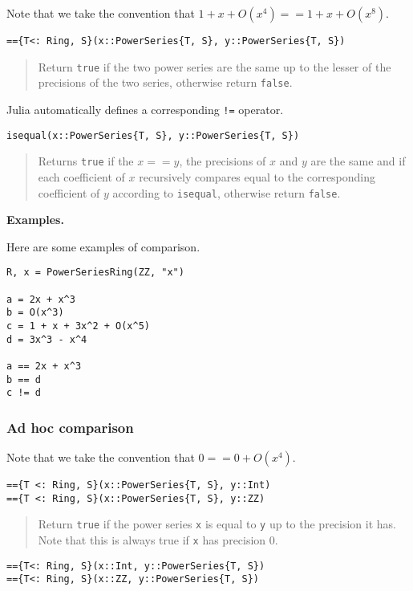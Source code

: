 \documentclass[a4paper,10pt]{article}
\newcommand{\code}{\lstinline}
\newcommand{\desc}[1]{\vspace{-3mm}\begin{quote}#1\end{quote}}
\begin{document}
{{Note that we take the convention that $1 + x + O(x^4) == 1 + x + O(x^8)$. 

\begin{lstlisting}
=={T<: Ring, S}(x::PowerSeries{T, S}, y::PowerSeries{T, S})
\end{lstlisting}

\desc{Return \code{true} if the two power series are the same up to the lesser
of the precisions of the two series, otherwise return \code{false}.}

Julia automatically defines a corresponding \code{!=} operator.

\begin{lstlisting}
isequal(x::PowerSeries{T, S}, y::PowerSeries{T, S})
\end{lstlisting}

\desc{Returns \code{true} if the $x == y$, the precisions of $x$ and $y$ are
the same and if each coefficient of $x$ recursively compares equal to the
corresponding coefficient of $y$ according to \code{isequal}, otherwise return
\code{false}.}

\textbf{Examples.}

Here are some examples of comparison.

\begin{lstlisting}
R, x = PowerSeriesRing(ZZ, "x")

a = 2x + x^3
b = O(x^3)
c = 1 + x + 3x^2 + O(x^5)
d = 3x^3 - x^4

a == 2x + x^3
b == d
c != d
\end{lstlisting}

\subsubsection{Ad hoc comparison}

Note that we take the convention that $0 == 0 + O(x^4)$.

\begin{lstlisting}
=={T <: Ring, S}(x::PowerSeries{T, S}, y::Int)
=={T <: Ring, S}(x::PowerSeries{T, S}, y::ZZ)
\end{lstlisting}

\desc{Return \code{true} if the power series \code{x} is equal to \code{y} up
to the precision it has. Note that this is always true if \code{x} has
precision $0$.}

\begin{lstlisting}
=={T<: Ring, S}(x::Int, y::PowerSeries{T, S})
=={T<: Ring, S}(x::ZZ, y::PowerSeries{T, S})
\end{lstlisting}

}}
\end{document}
